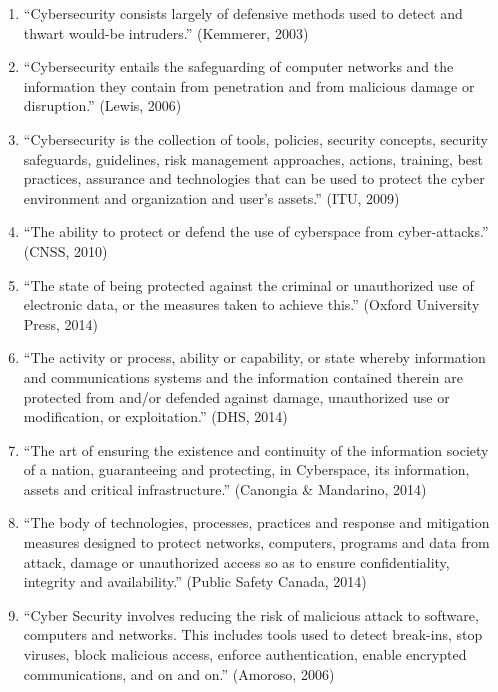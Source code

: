 \begin{enumerate}
  \item “Cybersecurity consists largely of defensive methods used to
    detect and thwart would-be intruders.” (Kemmerer, 2003)
  \item “Cybersecurity entails the safeguarding of computer networks and
    the information they contain from penetration and from malicious
    damage or disruption.” (Lewis, 2006)
  \item “Cybersecurity is the collection of tools, policies, security
    concepts, security safeguards, guidelines, risk management
    approaches, actions, training, best practices, assurance and
    technologies that can be used to protect the cyber environment and
    organization and user's assets.” (ITU, 2009)
  \item “The ability to protect or defend the use of cyberspace from
    cyber-attacks.” (CNSS, 2010)
  \item “The state of being protected against the criminal or
    unauthorized use of electronic data, or the measures taken to
    achieve this.” (Oxford University Press, 2014)
  \item “The activity or process, ability or capability, or state
    whereby information and communications systems and the information
    contained therein are protected from and/or defended against damage,
    unauthorized use or modification, or exploitation.” (DHS, 2014)
  \item “The art of ensuring the existence and continuity of the
    information society of a nation, guaranteeing and protecting, in
    Cyberspace, its information, assets and critical infrastructure.”
    (Canongia \& Mandarino, 2014)
  \item “The body of technologies, processes, practices and response and
    mitigation measures designed to protect networks, computers,
    programs and data from attack, damage or unauthorized access so as
    to ensure confidentiality, integrity and availability.” (Public
    Safety Canada, 2014) 
  \item “Cyber Security involves reducing the risk of malicious attack
    to software, computers and networks. This includes tools used to
    detect break-ins, stop viruses, block malicious access, enforce
    authentication, enable encrypted communications, and on and on.”
    (Amoroso, 2006)
\end{enumerate}

\documentclass{article}
\usepackage[a4paper,margin=1in]{geometry}



